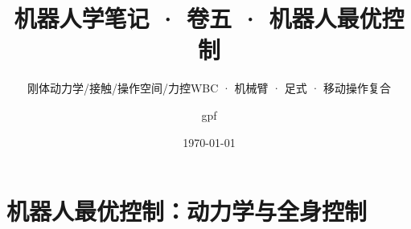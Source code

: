 
\usepackage{xr-hyper}


\title{机器人学笔记 · 卷五 · 机器人最优控制}
\subtitle{刚体动力学/接触/操作空间/力控WBC · 机械臂 · 足式 · 移动操作复合}
\author{gpf}\date{\today}


\maketitle
\frontmatter
{}
\tableofcontents
\mainmatter
\part{机器人最优控制：动力学与全身控制}











\backmatter
\nocite{*}
\printbibliography[heading=bibintoc, title={参考文献}]

